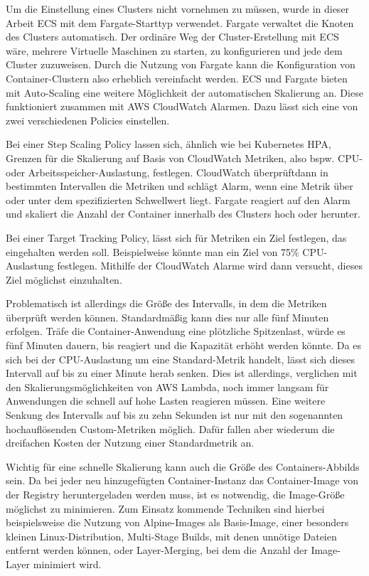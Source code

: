 Um die Einstellung eines Clusters nicht vornehmen zu müssen, wurde in dieser Arbeit \ac{ECS} mit dem Fargate-Starttyp verwendet. Fargate verwaltet die Knoten des Clusters automatisch. Der ordinäre Weg der Cluster-Erstellung mit \ac{ECS} wäre, mehrere Virtuelle Maschinen zu starten, zu konfigurieren und jede dem Cluster zuzuweisen. Durch die Nutzung von Fargate kann die Konfiguration von Container-Clustern also erheblich vereinfacht werden. \ac{ECS} und Fargate bieten mit Auto-Scaling eine weitere Möglichkeit der automatischen Skalierung an. Diese funktioniert zusammen mit \ac{AWS} CloudWatch Alarmen. Dazu lässt sich eine von zwei verschiedenen Policies einstellen.

Bei einer Step Scaling Policy lassen sich, ähnlich wie bei Kubernetes \ac{HPA}, Grenzen für die Skalierung auf Basis von CloudWatch Metriken, also bspw. CPU- oder Arbeitsspeicher-Auslastung, festlegen. CloudWatch überprüft\linebreak dann in bestimmten Intervallen die Metriken und schlägt Alarm, wenn eine Metrik über oder unter dem spezifizierten Schwellwert liegt. Fargate reagiert auf den Alarm und skaliert die Anzahl der Container innerhalb des Clusters hoch oder herunter\cite{noauthor_amazon_nodate}. 

Bei einer Target Tracking Policy, lässt sich für Metriken ein Ziel festlegen, das eingehalten werden soll. Beispielweise könnte man ein Ziel von 75\% CPU-Auslastung festlegen. Mithilfe der CloudWatch Alarme wird dann versucht, dieses Ziel möglichst einzuhalten\cite{noauthor_amazon_nodate}.

Problematisch ist allerdings die Größe des Intervalls, in dem die Metriken überprüft werden können. Standardmäßig kann dies nur alle fünf Minuten erfolgen. Träfe die Container-Anwendung eine plötzliche Spitzenlast, würde es fünf Minuten dauern, bis reagiert und die Kapazität erhöht werden könnte. Da es sich bei der CPU-Auslastung um eine Standard-Metrik handelt, lässt sich dieses Intervall auf bis zu einer Minute herab senken\cite{noauthor_cloudwatch_concepts}. Dies ist allerdings, verglichen mit den Skalierungsmöglichkeiten von \ac{AWS} Lambda, noch immer langsam für Anwendungen die schnell auf hohe Lasten reagieren müssen. Eine weitere Senkung des Intervalls auf bis zu zehn Sekunden ist nur mit den sogenannten hochauflösenden Custom-Metriken möglich. Dafür fallen aber wiederum die dreifachen Kosten der Nutzung einer Standardmetrik an\cite{noauthor_cloudwatch_preise}.

Wichtig für eine schnelle Skalierung kann auch die Größe des Containers-Abbilds sein. Da bei jeder neu hinzugefügten Container-Instanz das \linebreak Container-Image von der Registry heruntergeladen werden muss\cite{noauthor_amazon_nodate}, ist es notwendig, die Image-Größe möglichst zu minimieren. Zum Einsatz kommende Techniken sind hierbei beispielsweise die Nutzung von Alpine-Images als Basis-Image, einer besonders kleinen Linux-Distribution, Multi-Stage \linebreak Builds, mit denen unnötige Dateien entfernt werden können, oder Layer-Merging, bei dem die Anzahl der Image-Layer minimiert wird\cite{noauthor_how_nodate}.


